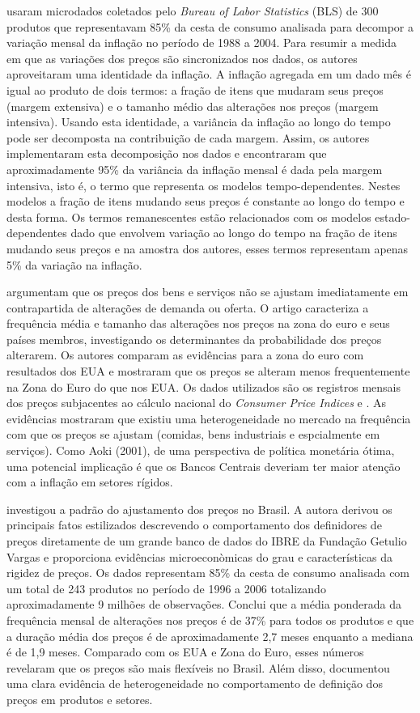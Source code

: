 \documentclass[twoside,a4paper,11pt]{report}
\begin{document}
\citet{klenow2008state} usaram microdados coletados pelo \emph{Bureau of Labor Statistics} (BLS) de 300 produtos que representavam 85\% da cesta de consumo analisada para decompor a variação mensal da inflação no período de 1988 a 2004. Para resumir a medida em que as variações dos preços são sincronizados nos dados, os autores aproveitaram uma identidade da inflação. A inflação agregada em um dado mês é igual ao produto de dois termos: a fração de itens que mudaram seus preços (margem extensiva) e o tamanho médio das alterações nos preços (margem intensiva). Usando esta identidade, a variância da inflação ao longo do tempo pode ser decomposta na contribuição de cada margem. Assim, os autores implementaram esta decomposição nos dados e encontraram que aproximadamente 95\% da variância da inflação mensal é dada pela margem intensiva, isto é, o termo que representa os modelos tempo-dependentes. Nestes modelos a fração de itens mudando seus preços é constante ao longo do tempo e desta forma. Os termos remanescentes estão relacionados com os modelos estado-dependentes dado que envolvem variação ao longo do tempo na fração de itens mudando seus preços e na amostra dos autores, esses termos representam apenas 5\% da variação na inflação.

\citet{dhyne2006price} argumentam que os preços dos bens e serviços não se ajustam imediatamente em contrapartida de alterações de demanda ou oferta. O artigo caracteriza a frequência média e tamanho das alterações nos preços na zona do euro e seus países membros, investigando os determinantes da probabilidade dos preços alterarem. Os autores comparam as evidências para a zona do euro com resultados dos EUA e mostraram que os preços se alteram menos frequentemente na Zona do Euro do que nos EUA. Os dados utilizados são os registros mensais dos preços subjacentes ao cálculo nacional do \emph{Consumer Price Indices} e . As evidências mostraram que existiu uma heterogeneidade no mercado na frequência com que os preços se ajustam (comidas, bens industriais e espcialmente em serviços). Como Aoki (2001), de uma perspectiva de política monetária ótima, uma potencial implicação é que os Bancos Centrais deveriam ter maior atenção com a inflação em setores rígidos. 

\citet{gouvea2007nominal} investigou a padrão do ajustamento dos preços no Brasil. A autora derivou os principais fatos estilizados descrevendo o comportamento dos definidores de preços diretamente de um grande banco de dados do IBRE da Fundação Getulio Vargas e proporciona evidências microeconòmicas do grau e características da rigidez de preços. Os dados representam 85\% da cesta de consumo analisada com um total de 243 produtos no período de 1996 a 2006 totalizando aproximadamente 9 milhões de observações. Conclui que a média ponderada da frequência mensal de alterações nos preços é de 37\% para todos os produtos e que a duração média dos preços é de aproximadamente 2,7 meses enquanto a mediana é de 1,9 meses. Comparado com os EUA e Zona do Euro, esses números revelaram que os preços são mais flexíveis no Brasil. Além disso, documentou uma clara evidência de heterogeneidade no comportamento de definição dos preços em produtos e setores.
\end{document}
